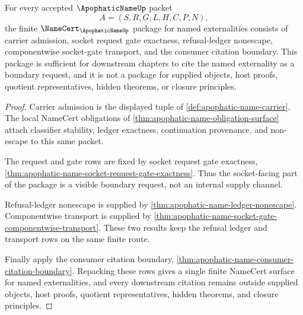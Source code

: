 \begin{theorem}
\label{thm:apophatic-name-named-externality-namecert-package}
For every accepted $\ApophaticNameUp$ packet
$$
A=(S,R,G,L,H,C,P,N),
$$
the finite $\NameCert_{\ApophaticNameUp}$ package for named externalities consists of carrier admission, socket request gate exactness, refusal-ledger nonescape, componentwise socket-gate transport, and the consumer citation boundary. This package is sufficient for downstream chapters to cite the named externality as a boundary request, and it is not a package for supplied objects, host proofs, quotient representatives, hidden theorems, or closure principles.
\end{theorem}
\begin{proof}
Carrier admission is the displayed tuple of \autoref{def:apophatic-name-carrier}. The local NameCert obligations of \autoref{thm:apophatic-name-obligation-surface} attach classifier stability, ledger exactness, continuation provenance, and non-escape to this same packet.

The request and gate rows are fixed by socket request gate exactness, \autoref{thm:apophatic-name-socket-request-gate-exactness}. Thus the socket-facing part of the package is a visible boundary request, not an internal supply channel.

Refusal-ledger nonescape is supplied by \autoref{thm:apophatic-name-ledger-nonescape}. Componentwise transport is supplied by \autoref{thm:apophatic-name-socket-gate-componentwise-transport}. These two results keep the refusal ledger and transport rows on the same finite route.

Finally apply the consumer citation boundary, \autoref{thm:apophatic-name-consumer-citation-boundary}. Repacking these rows gives a single finite NameCert surface for named externalities, and every downstream citation remains outside supplied objects, host proofs, quotient representatives, hidden theorems, and closure principles.
\end{proof}





